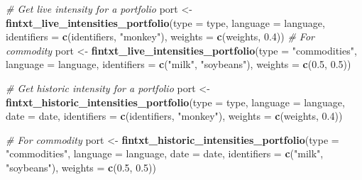\documentclass[]{book}
\newenvironment{Shaded}{\begin{snugshade}}{\end{snugshade}}
\newcommand{\KeywordTok}[1]{\textcolor[rgb]{0.13,0.29,0.53}{\textbf{#1}}}
\newcommand{\DataTypeTok}[1]{\textcolor[rgb]{0.13,0.29,0.53}{#1}}
\newcommand{\FloatTok}[1]{\textcolor[rgb]{0.00,0.00,0.81}{#1}}
\newcommand{\StringTok}[1]{\textcolor[rgb]{0.31,0.60,0.02}{#1}}
\newcommand{\CommentTok}[1]{\textcolor[rgb]{0.56,0.35,0.01}{\textit{#1}}}
\newcommand{\NormalTok}[1]{#1}
\theoremstyle{definition}
\theoremstyle{definition}
\theoremstyle{definition}
\theoremstyle{remark}
\begin{document}
\begin{Shaded}
\begin{Highlighting}[]
\CommentTok{# Get live intensity for a portfolio}
\NormalTok{port <-}\StringTok{ }\KeywordTok{fintxt_live_intensities_portfolio}\NormalTok{(}\DataTypeTok{type =}\NormalTok{ type,}
                                          \DataTypeTok{language =}\NormalTok{ language,}
                                          \DataTypeTok{identifiers =} \KeywordTok{c}\NormalTok{(identifiers, }\StringTok{"monkey"}\NormalTok{),}
                                          \DataTypeTok{weights =} \KeywordTok{c}\NormalTok{(weights, }\FloatTok{0.4}\NormalTok{))}
\CommentTok{# For commodity}
\NormalTok{port <-}\StringTok{ }\KeywordTok{fintxt_live_intensities_portfolio}\NormalTok{(}\DataTypeTok{type =} \StringTok{"commodities"}\NormalTok{,}
                                          \DataTypeTok{language =}\NormalTok{ language,}
                                          \DataTypeTok{identifiers =} \KeywordTok{c}\NormalTok{(}\StringTok{"milk"}\NormalTok{, }\StringTok{"soybeans"}\NormalTok{),}
                                          \DataTypeTok{weights =} \KeywordTok{c}\NormalTok{(}\FloatTok{0.5}\NormalTok{, }\FloatTok{0.5}\NormalTok{))}

\CommentTok{# Get historic intensity for a portfolio}
\NormalTok{port <-}\StringTok{ }\KeywordTok{fintxt_historic_intensities_portfolio}\NormalTok{(}\DataTypeTok{type =}\NormalTok{ type,}
                                          \DataTypeTok{language =}\NormalTok{ language,}
                                          \DataTypeTok{date =}\NormalTok{ date,}
                                          \DataTypeTok{identifiers =} \KeywordTok{c}\NormalTok{(identifiers, }\StringTok{"monkey"}\NormalTok{),}
                                          \DataTypeTok{weights =} \KeywordTok{c}\NormalTok{(weights, }\FloatTok{0.4}\NormalTok{))}
                                          
\CommentTok{# For commodity}
\NormalTok{port <-}\StringTok{ }\KeywordTok{fintxt_historic_intensities_portfolio}\NormalTok{(}\DataTypeTok{type =} \StringTok{"commodities"}\NormalTok{,}
                                              \DataTypeTok{language =}\NormalTok{ language,}
                                              \DataTypeTok{date =}\NormalTok{ date,}
                                              \DataTypeTok{identifiers =} \KeywordTok{c}\NormalTok{(}\StringTok{"milk"}\NormalTok{, }\StringTok{"soybeans"}\NormalTok{),}
                                              \DataTypeTok{weights =} \KeywordTok{c}\NormalTok{(}\FloatTok{0.5}\NormalTok{, }\FloatTok{0.5}\NormalTok{))}
\end{Highlighting}
\end{Shaded}
\end{document}
